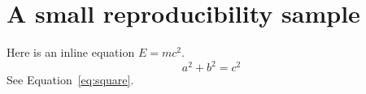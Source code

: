 \documentclass{article}
\begin{document}
\section{A small reproducibility sample}
Here is an inline equation $E=mc^2$.
\begin{equation}\label{eq:square} a^2+b^2=c^2 \end{equation}
See Equation~\ref{eq:square}.
\end{document}
